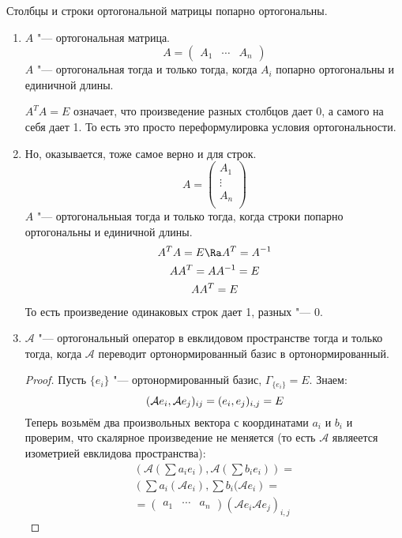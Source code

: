 \begin{conseq}
	Столбцы и строки ортогональной матрицы попарно ортогональны.
	\begin{enumerate} 
	\item 
	$A$ "--- ортогональная матрица.
	\[ A = \begin{pmatrix} A_1 & \cdots & A_n\end{pmatrix} \]
	$A$ "--- ортогональная тогда и только тогда, когда $A_i$ попарно ортогональны и единичной длины.

	$A^T A = E$ означает, что произведение разных столбцов дает 0, а самого на себя дает 1.
	То есть это просто переформулировка условия ортогональности.
	\item 
	Но, оказывается, тоже самое верно и для строк.
	\[ A = \begin{pmatrix} A_1 \\ \vdots \\ A_n \\ \end{pmatrix} \]
	$A$ "--- ортогональныая тогда и только тогда, когда строки попарно ортогональны и единичной длины.
	\begin{gather*}
		A^T A = E \Ra A^T  = A^{-1} \\
		A A^T  = A A^{-1} = E \\
		A A^T = E
	\end{gather*}
	То есть произведение одинаковых строк дает 1, разных "--- 0.
	\item 
	$\mathcal A$ "--- ортогональный оператор в евклидовом пространстве тогда и только тогда,
	когда $\mathcal A$ переводит ортонормированный базис в ортонормированный.
	\begin{proof}
		Пусть $\{e_i\}$ "--- ортонормированный базис, $\Gamma_{\{e_i\}} = E$.
		Знаем:
		\[
			(\mathcal A e_i, \mathcal A e_j)_{ij} = (e_i,e_j)_{i, j} = E \\
		\]
		Теперь возьмём два произвольных вектора с координатами $a_i$ и $b_i$ и проверим, что скалярное произведение не меняется
		(то есть $\mathcal A$ являеется изометрией евклидова пространства):
		\begin{gather*}
			\left(\mathcal A \left(\sum a_i e_i\right), \mathcal A \left(\sum b_i e_i\right)\right) = \\
			\left(\sum a_i (\mathcal A e_i), \sum b_i (\mathcal A e_i\right) = \\
			=
				\begin{pmatrix} a_1 & \cdots & a_n \end{pmatrix}
				(\mathcal A e_i \mathcal A e_j)_{i, j}

\end{gather*}
\end{proof}
\end{enumerate}
\end{conseq}
